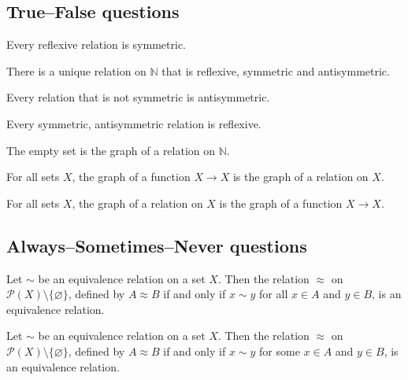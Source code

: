 \subsection*{True--False questions}


\begin{chapex} %
\label{cqRelationsTFBegin}
Every reflexive relation is symmetric.
\end{chapex}

\begin{chapex} %
There is a unique relation on $\mathbb{N}$ that is reflexive, symmetric and antisymmetric.
\end{chapex}

\begin{chapex} %
Every relation that is not symmetric is antisymmetric.
\end{chapex}

\begin{chapex} %
Every symmetric, antisymmetric relation is reflexive.
\end{chapex}

\begin{chapex} %
The empty set is the graph of a relation on $\mathbb{N}$.
\end{chapex}

\begin{chapex} %
For all sets $X$, the graph of a function $X \to X$ is the graph of a relation on $X$.
\end{chapex}

\begin{chapex} %
\label{cqRelationsTFEnd}
For all sets $X$, the graph of a relation on $X$ is the graph of a function $X \to X$.
\end{chapex}

\subsection*{Always--Sometimes--Never questions}


\begin{chapex} %
\label{cqRelationsASNBegin}
Let $\sim$ be an equivalence relation on a set $X$. Then the relation $\approx$ on $\mathcal{P}(X) \setminus \{ \varnothing \}$, defined by $A \approx B$ if and only if $x \sim y$ for all $x \in A$ and $y \in B$, is an equivalence relation.
\end{chapex}

\begin{chapex} %
\label{cqRelationsASNEnd}
Let $\sim$ be an equivalence relation on a set $X$. Then the relation $\approx$ on $\mathcal{P}(X) \setminus \{ \varnothing \}$, defined by $A \approx B$ if and only if $x \sim y$ for some $x \in A$ and $y \in B$, is an equivalence relation.
\end{chapex}